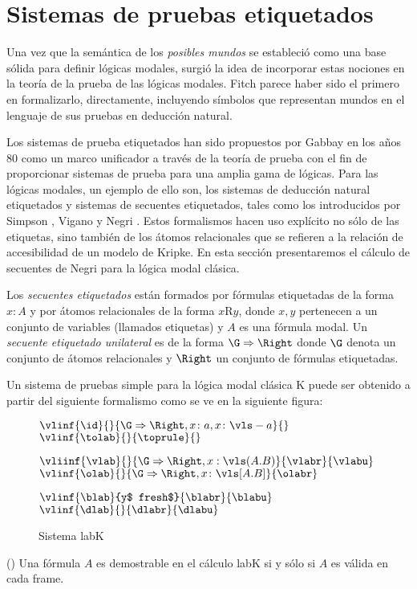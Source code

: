 \chapter{Sistemas de pruebas etiquetados}

Una vez que la semántica de los \emph{posibles mundos} se estableció como una base sólida para definir lógicas modales, surgió la idea de incorporar estas nociones en la teoría de la prueba de las lógicas modales. Fitch parece haber sido el primero en formalizarlo, directamente, incluyendo símbolos que representan mundos en el lenguaje de sus pruebas en deducción natural.

Los sistemas de prueba etiquetados han sido propuestos por Gabbay \cite{gabbay1996} en los años 80 como un marco unificador a través de la teoría de prueba con el fin de proporcionar sistemas de prueba para una amplia gama de lógicas. Para las lógicas modales, un ejemplo de ello  son, los sistemas de deducción natural etiquetados y sistemas de secuentes etiquetados, tales como los introducidos por Simpson \cite{simpson1994}, Vigano \cite{vigano2013} y Negri \cite{negri2005}. Estos formalismos hacen uso explícito no sólo de las etiquetas, sino también de los átomos relacionales que se refieren a la relación de accesibilidad de un modelo de Kripke. En esta sección presentaremos el cálculo de secuentes de Negri para la lógica modal clásica.

Los \emph{secuentes etiquetados} están formados por fórmulas etiquetadas de la forma $x \colon A$ y por átomos relacionales de la forma $x$R$y$, donde $x, y$ pertenecen a un conjunto de variables (llamados etiquetas) y $A$ es una fórmula modal. Un \emph{secuente etiquetado unilateral} es de la forma $\G \Rightarrow \Right$ donde $\G$ denota un conjunto de átomos relacionales y $\Right$ un conjunto de fórmulas etiquetadas.

Un sistema de pruebas simple para la lógica modal clásica K puede ser obtenido a partir del siguiente formalismo como se ve en la siguiente figura:

\vspace{3mm}

\begin{figure}[h]
	\begin{center}
			$\vlinf{\id}{}{\G \Rightarrow \Right, x \colon a, x \colon \vls-a}{}$ \hspace{25mm}	
			$\vlinf{\tolab}{}{\toprule}{}$
		
			
			$\vliinf{\vlab}{}{\G \Rightarrow \Right, x :\vls(A.B)}{\vlabr}{\vlabu}$\hspace{9mm}
			$\vlinf{\olab}{}{\G \Rightarrow \Right, x \colon \vls[A.B]}{\olabr}$
			
		\hspace{8mm}$\vlinf{\blab}{y$ fresh$}{\blabr}{\blabu}$ \hspace{9mm} $\vlinf{\dlab}{}{\dlabr}{\dlabu}$
			

	\end{center}
	\caption{Sistema labK}
\end{figure}

\vspace{5mm}

\begin{teo}(\cite{negri2005}) 
	Una fórmula $A$ es demostrable en el cálculo labK si y sólo si $A$ es válida en cada frame.
\end{teo}

\newpage